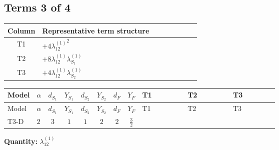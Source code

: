 \documentclass[8pt]{article}
\begin{document}
\begin{landscape}
\subsection*{Terms 3 of 4}
\begin{center}
\begin{tabular}{@{}c >{\raggedright\arraybackslash}p{0.82\linewidth}@{}}
\toprule
Column & Representative term structure \\
\midrule
T1 & \(\displaystyle +4 {\lambda_{12}^{(1)}}^2\) \\
\midrule
T2 & \(\displaystyle +8 {\lambda_{12}^{(1)}} {\lambda_{S_1}^{(1)}}\) \\
\midrule
T3 & \(\displaystyle +4 {\lambda_{12}^{(1)}} {\lambda_{S_2}^{(1)}}\) \\
\midrule
\bottomrule
\end{tabular}
\end{center}
\smallskip
\tiny
\begin{longtable}{@{}llcccccc >{\raggedright\arraybackslash}p{0.21\linewidth} >{\raggedright\arraybackslash}p{0.21\linewidth} >{\raggedright\arraybackslash}p{0.21\linewidth}@{}}
\toprule
Model & $\alpha$ & $d_{S_1}$ & $Y_{S_1}$ & $d_{S_2}$ & $Y_{S_2}$ & $d_F$ & $Y_F$ & T1 & T2 & T3 \\
\midrule
\endfirsthead
\toprule
Model & $\alpha$ & $d_{S_1}$ & $Y_{S_1}$ & $d_{S_2}$ & $Y_{S_2}$ & $d_F$ & $Y_F$ & T1 & T2 & T3 \\
\midrule
\endhead
T3-D & $2$ & $3$ & $1$ & $1$ & $2$ & $2$ & $\frac{3}{2}$ & \scriptsize\adjustbox{max width=\linewidth}{$\begin{gathered} +4 {\lambda_{12}^{(1)}}^2\end{gathered}$} & \scriptsize\adjustbox{max width=\linewidth}{$\begin{gathered} +8 {\lambda_{12}^{(1)}} {\lambda_{S_1}^{(1)}}\end{gathered}$} & \scriptsize\adjustbox{max width=\linewidth}{$\begin{gathered} +4 {\lambda_{12}^{(1)}} {\lambda_{S_2}^{(1)}}\end{gathered}$} \\
\midrule
\bottomrule
\end{longtable}
\clearpage
\noindent\textbf{Quantity: }$\lambda_{12}^{(1)}$\par\smallskip

\end{landscape}
\end{document}
